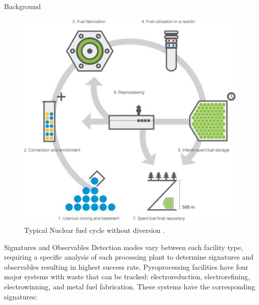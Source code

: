 \documentclass[final]{beamer}
\newlength{\onecolwid}
\newlength{\threecolwid}
\begin{document}
\begin{frame}[t]
\begin{columns}[t,totalwidth=\threecolwid]
\begin{column}{\onecolwid}
\begin{block}{Background}
\begin{figure}
	\includegraphics[width=1.0\linewidth]{fuel_cycle2.png}
	\caption{Typical Nuclear fuel cycle without diversion \cite{Slovenske}.}
\end{figure}

\end{block}


\begin{block}{Signatures and Observables}
        Detection modes vary between each facility type, requiring a specific analysis of each processing plant to determine
        signatures and observables resulting in highest success rate. Pyroprocessing facilities have four major systems with waste
        that can be tracked: electroreduction, electrorefining, electrowinning, and metal fuel fabrication\cite{Borrelli_2017}.
        These systems have the corresponding signatures:
	

\end{block}
\end{column}
\end{columns}
\end{frame}
\end{document}
